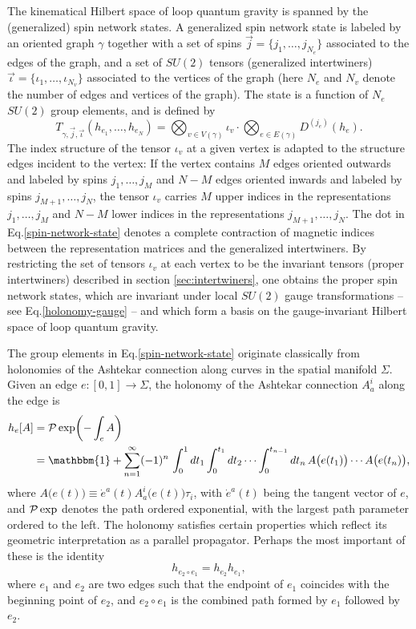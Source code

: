 \documentclass[graybox, secnum]{svmult}
\makeatletter
\newcommand{\Eq}[1]{Eq.\@\xspace\eqref{#1}}
\newcommand{\Id}{\mathbbm{1}}
\newcommand{\idx}[1]{#1}
\makeatother
\begin{document}
The kinematical Hilbert space of loop quantum gravity is spanned by the (generalized) spin network states. A generalized \idx{spin network state} is labeled by an oriented graph $\gamma$ together with a set of spins $\vec j = \{j_1, \dots, j_{N_e}\}$ associated to the edges of the graph, and a set of $SU(2)$ tensors (generalized intertwiners) $\vec\iota = \{\iota_1, \dots, \iota_{N_v}\}$ associated to the vertices of the graph (here $N_e$ and $N_v$ denote the number of edges and vertices of the graph). The state is a function of $N_e$ $SU(2)$ group elements, and is defined by
\begin{equation}
	T_{\gamma,\vec{j},\vec{\iota}}(h_{e_1}, \dots, h_{e_N}) = \bigotimes_{v\in V(\gamma)} \iota_v\cdot \bigotimes_{e\in E(\gamma)} D^{(j_e)}(h_e).
	\label{spin-network-state}
\end{equation}
The index structure of the tensor $\iota_v$ at a given vertex is adapted to the structure edges incident to the vertex: If the vertex contains $M$ edges oriented outwards and labeled by spins $j_1, \dots, j_M$ and $N-M$ edges oriented inwards and labeled by spins $j_{M+1}, \dots, j_N$, the tensor $\iota_v$ carries $M$ upper indices in the representations $j_1, \dots, j_M$ and $N-M$ lower indices in the representations $j_{M+1}, \dots, j_N$. The dot in \Eq{spin-network-state} denotes a complete contraction of magnetic indices between the representation matrices and the generalized intertwiners. By restricting the set of tensors $\iota_v$ at each vertex to be the invariant tensors (proper intertwiners) described in section \ref{sec:intertwiners}, one obtains the proper spin network states, which are invariant under local $SU(2)$ gauge transformations -- see \Eq{holonomy-gauge} -- and which form  a basis on the gauge-invariant Hilbert space of loop quantum gravity.

The group elements in \Eq{spin-network-state} originate classically from holonomies of the Ashtekar connection along curves in the spatial manifold $\Sigma$. Given an edge $e : [0,1] \to \Sigma$, the holonomy of the Ashtekar connection $A_a^i$ along the edge is
\begin{align}
	h_e[A] &= {\cal P}\exp\biggl(-\int_e A\biggr) \notag \\
	&= \Id + \sum_{n=1}^\infty (-1)^n\,\int_0^1 dt_1\int_0^{t_1} dt_2\,\dots \int_0^{t_{n-1}}dt_n\,A\bigl(e(t_1)\bigr)\cdots A\bigl(e(t_n)\bigr),
	\label{}
\end{align}
where $A\bigl(e(t)\bigr) \equiv \dot e^a(t)A_a^i\bigl(e(t)\bigr)\tau_i$, with $\dot e^a(t)$ being the tangent vector of $e$, and ${\cal P}\exp$ denotes the path ordered exponential, with the largest path parameter ordered to the left. The holonomy satisfies certain properties which reflect its geometric interpretation as a parallel propagator. Perhaps the most important of these is the identity
\begin{equation}
	h_{e_2\circ e_1} = h_{e_2}h_{e_1},
	\label{h2h1}
\end{equation}
where $e_1$ and $e_2$ are two edges such that the endpoint of $e_1$ coincides with the beginning point of $e_2$, and $e_2\circ e_1$ is the combined path formed by $e_1$ followed by $e_2$.
\end{document}
